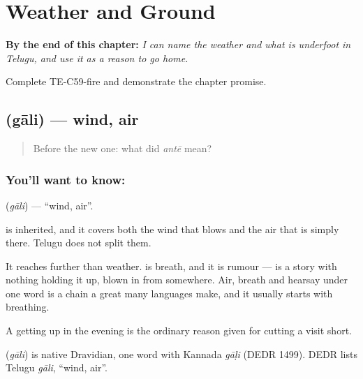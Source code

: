 
\chapter{Weather and Ground}
\label{ch:te-weather-ground}

\begin{chapteropening}
\textbf{By the end of this chapter:} \emph{I can name the weather and what is underfoot in Telugu, and use it as a reason to go home.}

Complete TE-C59-fire and demonstrate the chapter promise.
\end{chapteropening}

\section[\texorpdfstring{\te{గాలి} (gāli)}{గాలి (gāli)}]{ (gāli) — wind, air}

\label{lesson:TE-C59-wind}



\begin{quote}
Before the new one: what did \emph{antē} mean?
\end{quote}

\subsection*{You'll want to know: }
\textbf{} (\emph{gāli}) — \textquotedblleft{}wind, air\textquotedblright{}.

 is inherited, and it covers both the wind that blows and the air that is simply there. Telugu does not split them.

It reaches further than weather.  is breath, and it is rumour —   is a story with nothing holding it up, blown in from somewhere. Air, breath and hearsay under one word is a chain a great many languages make, and it usually starts with breathing.

A  getting up in the evening is the ordinary reason given for cutting a visit short.

\begin{cousinweb}
\textbf{} (\emph{gāli}) is native Dravidian, one word with Kannada \emph{gāḷi} (DEDR 1499). DEDR lists Telugu \emph{gāli}, \textquotedblleft{}wind, air\textquotedblright{}.
\end{cousinweb}

